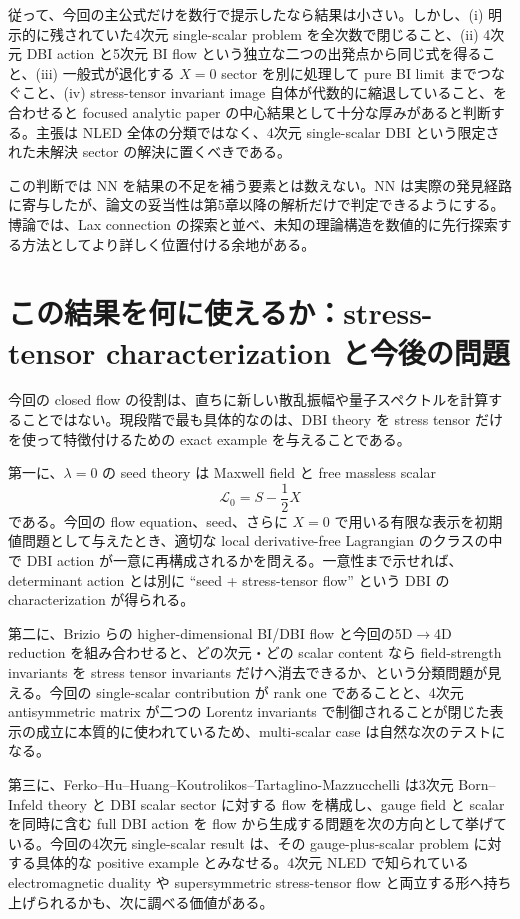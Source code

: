 \documentclass[a4paper,11pt]{ltjsreport}
\newcommand{\Lag}{\mathcal L}
\begin{document}
従って、今回の主公式だけを数行で提示したなら結果は小さい。しかし、(i) 明示的に残されていた4次元 single-scalar problem を全次数で閉じること、(ii) 4次元 DBI action と5次元 BI flow という独立な二つの出発点から同じ式を得ること、(iii) 一般式が退化する $X=0$ sector を別に処理して pure BI limit までつなぐこと、(iv) stress-tensor invariant image 自体が代数的に縮退していること、を合わせると focused analytic paper の中心結果として十分な厚みがあると判断する。主張は NLED 全体の分類ではなく、4次元 single-scalar DBI という限定された未解決 sector の解決に置くべきである。

この判断では NN を結果の不足を補う要素とは数えない。NN は実際の発見経路に寄与したが、論文の妥当性は第5章以降の解析だけで判定できるようにする。博論では、Lax connection の探索と並べ、未知の理論構造を数値的に先行探索する方法としてより詳しく位置付ける余地がある。

\section{この結果を何に使えるか：stress-tensor characterization と今後の問題}

今回の closed flow の役割は、直ちに新しい散乱振幅や量子スペクトルを計算することではない。現段階で最も具体的なのは、DBI theory を stress tensor だけを使って特徴付けるための exact example を与えることである。

第一に、$\lambda=0$ の seed theory は Maxwell field と free massless scalar
\begin{equation}
 \Lag_0=S-\frac12X
\end{equation}
である。今回の flow equation、seed、さらに $X=0$ で用いる有限な表示を初期値問題として与えたとき、適切な local derivative-free Lagrangian のクラスの中で DBI action が一意に再構成されるかを問える。一意性まで示せれば、determinant action とは別に ``seed + stress-tensor flow'' という DBI の characterization が得られる。

第二に、Brizio らの higher-dimensional BI/DBI flow と今回の5D$\to$4D reduction を組み合わせると、どの次元・どの scalar content なら field-strength invariants を stress tensor invariants だけへ消去できるか、という分類問題が見える。今回の single-scalar contribution が rank one であることと、4次元 antisymmetric matrix が二つの Lorentz invariants で制御されることが閉じた表示の成立に本質的に使われているため、multi-scalar case は自然な次のテストになる。

第三に、Ferko--Hu--Huang--Koutrolikos--Tartaglino-Mazzucchelli は3次元 Born--Infeld theory と DBI scalar sector に対する flow を構成し、gauge field と scalar を同時に含む full DBI action を flow から生成する問題を次の方向として挙げている\cite{Ferko2024DBI}。今回の4次元 single-scalar result は、その gauge-plus-scalar problem に対する具体的な positive example とみなせる。4次元 NLED で知られている electromagnetic duality や supersymmetric stress-tensor flow と両立する形へ持ち上げられるかも、次に調べる価値がある\cite{Ferko2023a,Ferko2023b}。
\end{document}

